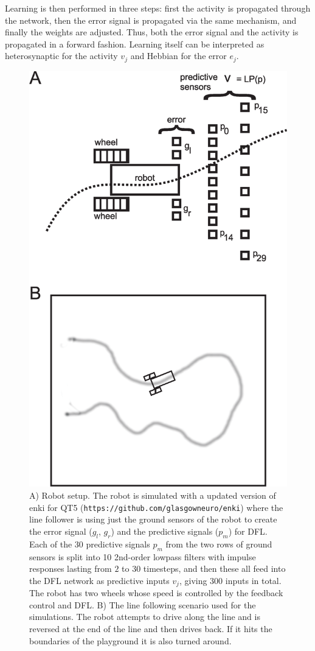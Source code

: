 \documentclass{aamas2018}
\begin{document}
Learning is then performed in three steps: first the activity is
propagated through the network, then the error signal is propagated
via the same mechanism, and finally the weights are adjusted. Thus,
both the error signal and the activity is propagated in a forward
fashion. Learning itself can be interpreted as heterosynaptic for the
activity $v_j$ and Hebbian for the error $e_j$.


\begin{figure}[!ht]
  \centering
  \includegraphics[width=0.85\columnwidth]{linefollower_robot_playground}
  \caption{A) Robot setup. The robot is simulated with a updated
    version of enki for QT5 (\texttt{https://github.com/glasgowneuro/enki})
    where the line follower is using just the ground sensors of the
    robot to create the error signal ($g_l$, $g_r$) and the predictive signals ($p_m$)
    for DFL. Each of the 30 predictive signals $p_m$ from the two rows of ground sensors
    is split into 10 2nd-order lowpass filters with impulse responses
    lasting from $2$ to $30$ timesteps, and then these all feed into the DFL
    network as predictive inputs $v_j$, giving 300 inputs in total.
    The robot has two wheels whose speed is controlled
    by the feedback control and DFL.
    B) The line following scenario used for the simulations. The robot
    attempts to drive along the line and is reversed at the end of the
    line and then drives back. If it hits the boundaries of the playground
    it is also turned around.
    \label{linefollower_robot_playground}}
\end{figure}
\end{document}
